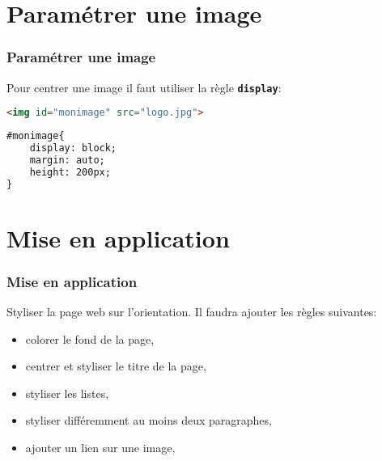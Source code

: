\documentclass[svgnames,11pt]{beamer}
\begin{document}
\section{Paramétrer une image}
\begin{frame}[fragile]
    \frametitle{Paramétrer une image}

    Pour centrer une image il faut utiliser la règle \textbf{\texttt{display}}:

\begin{center}
    \begin{lstlisting}[language=HTML , basicstyle=\ttfamily\small, xleftmargin=1em, xrightmargin=0em]
<img id="monimage" src="logo.jpg">
\end{lstlisting}
\end{center}
\begin{center}
    \begin{lstlisting}[language=HTML , basicstyle=\ttfamily\small, xleftmargin=1em, xrightmargin=0em]
#monimage{
    display: block;
    margin: auto;
    height: 200px;
}
\end{lstlisting}
\end{center}
\end{frame}
\section{Mise en application}
\begin{frame}
    \frametitle{Mise en application}

\begin{activite}
Styliser la page web sur l'orientation. Il faudra ajouter les règles suivantes:
\begin{itemize}
    \item colorer le fond de la page,
    \item centrer et styliser le titre de la page,
    \item styliser les listes,
    \item styliser différemment au moins deux paragraphes,
    \item ajouter un lien sur une image,
\end{itemize}
\end{activite}

\end{frame}
\end{document}
